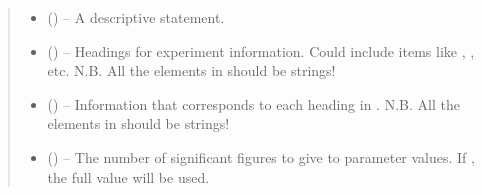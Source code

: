 \documentclass[letterpaper,10pt,english]{sphinxmanual}
\begin{document}
\begin{fulllineitems}
\begin{quote}
\begin{description}
\begin{itemize}
\begin{itemize}
\end{itemize}


\item {} 
\sphinxAtStartPar
{} (\sphinxstyleliteralemphasis{\sphinxupquote{, }}) – A descriptive statement.

\item {} 
\sphinxAtStartPar
{} (\sphinxstyleliteralemphasis{\sphinxupquote{, }}) – Headings for experiment information. Could include items like
, , etc.
N.B. All the elements in  should be strings!

\item {} 
\sphinxAtStartPar
{} (\sphinxstyleliteralemphasis{\sphinxupquote{, }}) – Information that corresponds to each heading in .
N.B. All the elements in  should be strings!

\item {} 
\sphinxAtStartPar
{} () – The number of significant figures to give to parameter values. If
, the full value will be used.


\end{itemize}
\end{description}
\end{quote}
\end{fulllineitems}
\end{document}

